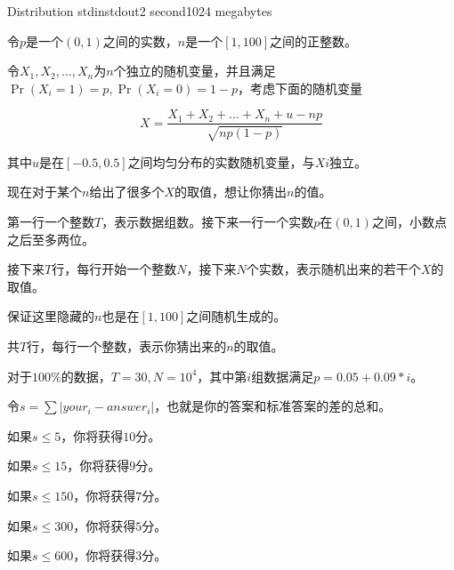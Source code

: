 \begin{problem}{Distribution}
{stdin}{stdout}{2 second}{1024 megabytes}

令$p$是一个$(0,1)$之间的实数，$n$是一个$[1,100]$之间的正整数。

令$X_1, X_2, \dots, X_n$为$n$个独立的随机变量，并且满足$\Pr(X_i=1)=p, \Pr(X_i=0)=1-p$，考虑下面的随机变量

$$X=\frac{X_1+X_2+\dots + X_n +u -np}{\sqrt{np(1-p)}}$$

其中$u$是在$[-0.5,0.5]$之间均匀分布的实数随机变量，与$Xi$独立。

现在对于某个$n$给出了很多个$X$的取值，想让你猜出$n$的值。

\Input

第一行一个整数$T$，表示数据组数。接下来一行一个实数$p$在$(0,1)$之间，小数点之后至多两位。

接下来$T$行，每行开始一个整数$N$，接下来$N$个实数，表示随机出来的若干个$X$的取值。

保证这里隐藏的$n$也是在$[1,100]$之间随机生成的。

\Output

共$T$行，每行一个整数，表示你猜出来的$n$的取值。

\Example
\begin{example}
\end{example}

\Constraints

对于$100\%$的数据，$T=30, N=10^4$，其中第$i$组数据满足$p=0.05+0.09*i$。

\Scoring

令$s=\sum |your_i-answer_i|$，也就是你的答案和标准答案的差的总和。

如果$s\leq 5$，你将获得$10$分。

如果$s\leq 15$，你将获得$9$分。

如果$s\leq 150$，你将获得$7$分。

如果$s\leq 300$，你将获得$5$分。

如果$s\leq 600$，你将获得$3$分。

\end{problem}